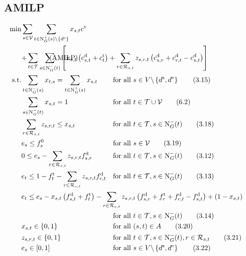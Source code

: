 \subsection{AMILP}

\begin{align}
	\min & \sum_{s\in\mathcal{V}} \sum_{t\in\Nout(s)\backslash\{d^{\operatorname{e}}\}} x_{s,t}c^{\operatorname{v}} \nonumber \\
	& \omit\rlap{$\displaystyle{ + \sum_{t\in\mathcal{T}} \sum_{s\in\Nin(t)} \left[x_{s,t}\left(c_{s,t}^{\operatorname{d}}+c_{t}^{\operatorname{t}}\right) + \sum_{r\in\Rst} z_{s,r,t}\left(c_{s,r}^{\operatorname{d}}+c_{r,t}^{\operatorname{d}}-c_{s,t}^{\operatorname{d}}\right)\right]}$} \tag{AMILP} \label{eq:AMILP} \\
	\text{s.t.} & \sum_{t\in\Nin(s)} x_{t,s} = \sum_{t\in\Nout(s)} x_{s,t} & & \text{for all } s\in V\backslash\left\{d^{\operatorname{s}},d^{\operatorname{e}}\right\} \tag{3.15} \\
	& \sum_{s\in\Nin(t)} x_{s,t} = 1 & & \text{for all } t\in\mathcal{T}\cup\mathcal{V} \tag{6.2} \\
	& \sum_{r\in\Rst} z_{s,r,t} \leq x_{s,t} & & \text{for all } t\in\mathcal{T}, s\in\Nin(t) \tag{3.18} \\
	& e_s \leq f_s^0 & & \text{for all } s\in\mathcal{V} \tag{3.19} \\
	& 0 \leq e_s - \sum_{r\in\Rst} z_{s,r,t}\fd_{s,r} & & \text{for all } t\in\mathcal{T}, s\in\Nin(t) \tag{3.12} \\
	& e_t \leq 1 - \ft_t - \sum_{r\in\Rst} z_{s,r,t}\fd_{r,t} & & \text{for all } t\in\mathcal{T}, s\in\Nin(t) \tag{3.13} \\
	& \omit\rlap{$\displaystyle{e_t \leq e_s - x_{s,t}\left(f_{s,t}^{\operatorname{d}}+f_t^{\operatorname{t}}\right) - \sum_{r\in\Rst} z_{s,r,t}\left(\fd_{s,r}+\ft_r+\fd_{r,t}-\fd_{s,t}\right) + \left(1-x_{s,t}\right)}$} \nonumber \\
	& & & \text{for all } t\in\mathcal{T}, s\in\Nin(t) \tag{3.14} \\
	& x_{s,t}\in\{0,1\} & & \text{for all } (s,t)\in A \tag{3.20}\\
	& z_{s,r,t}\in\{0,1\} & & \text{for all } t\in\mathcal{T},s\in\Nin(t),r\in\Rst \tag{3.21} \\
	& e_s\in[0,1] & & \text{for all } s\in V\backslash\left\{d^{\operatorname{s}},d^{\operatorname{e}}\right\} \tag{3.22}
\end{align}